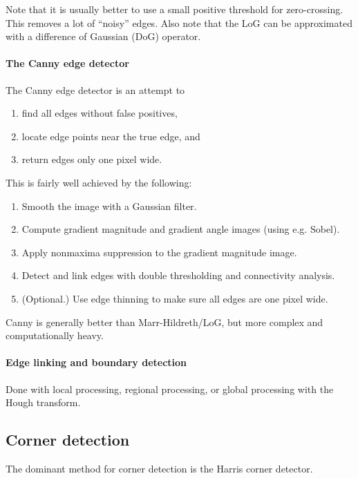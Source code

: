 Note that it is usually better to use a small positive threshold for zero-crossing. This removes a lot of ``noisy'' edges. Also note that the LoG can be approximated with a difference of Gaussian (DoG) operator.

\paragraph{The Canny edge detector} The Canny edge detector is an attempt to
\begin{enumerate}
    \item find all edges without false positives,
    \item locate edge points near the true edge, and
    \item return edges only one pixel wide.
\end{enumerate}
This is fairly well achieved by the following:
\begin{enumerate}
    \item Smooth the image with a Gaussian filter.
    \item Compute gradient magnitude and gradient angle images (using e.g. Sobel).
    \item Apply nonmaxima suppression to the gradient magnitude image.
    \item Detect and link edges with double thresholding and connectivity analysis.
    \item (Optional.) Use edge thinning to make sure all edges are one pixel wide.
\end{enumerate}

Canny is generally better than Marr-Hildreth/LoG, but more complex and computationally heavy.

\paragraph{Edge linking and boundary detection} Done with local processing, regional processing, or global processing with the Hough transform.

\subsection{Corner detection}
The dominant method for corner detection is the Harris corner detector.

